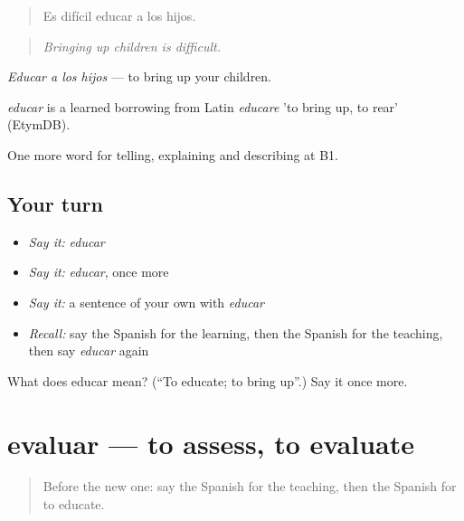 \begin{quote}
Es difícil educar a los hijos.
\end{quote}

\begin{quote}
\emph{Bringing up children is difficult.}
\end{quote}

\emph{Educar a los hijos} — to bring up your children.

\begin{cousinweb}
\emph{educar} is a learned borrowing from Latin \emph{educare} 'to bring up, to rear' (EtymDB).
\end{cousinweb}

\begin{grammarlens}[title={What you've built}]
One more word for telling, explaining and describing at B1.
\end{grammarlens}

\subsection*{Your turn}
\begin{itemize}
\raggedright
  \item \emph{Say it:} \emph{educar}
  \item \emph{Say it:} \emph{educar}, once more
  \item \emph{Say it:} a sentence of your own with \emph{educar}
  \item \emph{Recall:} say the Spanish for the learning, then the Spanish for the teaching, then say \emph{educar} again
\end{itemize}

\begin{tcolorbox}[breakable,colback=teal!4,colframe=teal!35!black,title={Before you move on}]
What does educar mean? (\textquotedblleft{}To educate; to bring up\textquotedblright{}.) Say it once more.
\end{tcolorbox}
\section[evaluar]{evaluar — to assess, to evaluate}

\label{lesson:ES-C597-evaluar}



\begin{quote}
Before the new one: say the Spanish for the teaching, then the Spanish for to educate.
\end{quote}

